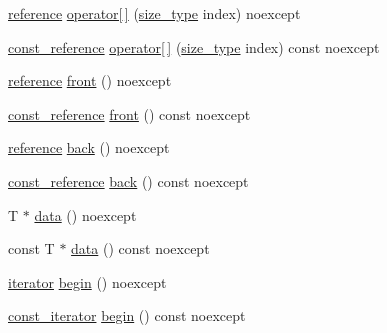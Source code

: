 \begin{DoxyCompactItemize}
\item 
\mbox{\hyperlink{classmage_1_1_dynamic_memory_buffer_a146681be5119c0329409436506334f05}{reference}} \mbox{\hyperlink{classmage_1_1_dynamic_memory_buffer_a0b301053c19560b621f9005cabae4596}{operator\mbox{[}$\,$\mbox{]}}} (\mbox{\hyperlink{classmage_1_1_dynamic_memory_buffer_a45d02825da2b18fd7c24965ed5f46a30}{size\+\_\+type}} index) noexcept
\item 
\mbox{\hyperlink{classmage_1_1_dynamic_memory_buffer_aa454489303e19392c54044d3b3ae67ad}{const\+\_\+reference}} \mbox{\hyperlink{classmage_1_1_dynamic_memory_buffer_abca35ce297de7c1c2e1f007024886c93}{operator\mbox{[}$\,$\mbox{]}}} (\mbox{\hyperlink{classmage_1_1_dynamic_memory_buffer_a45d02825da2b18fd7c24965ed5f46a30}{size\+\_\+type}} index) const noexcept
\item 
\mbox{\hyperlink{classmage_1_1_dynamic_memory_buffer_a146681be5119c0329409436506334f05}{reference}} \mbox{\hyperlink{classmage_1_1_dynamic_memory_buffer_a390f60b27001afa97a7c40aecb22db76}{front}} () noexcept
\item 
\mbox{\hyperlink{classmage_1_1_dynamic_memory_buffer_aa454489303e19392c54044d3b3ae67ad}{const\+\_\+reference}} \mbox{\hyperlink{classmage_1_1_dynamic_memory_buffer_abf584a6f81168b350ea4daa640f85034}{front}} () const noexcept
\item 
\mbox{\hyperlink{classmage_1_1_dynamic_memory_buffer_a146681be5119c0329409436506334f05}{reference}} \mbox{\hyperlink{classmage_1_1_dynamic_memory_buffer_a0b61ef41a8100874b1b468a90ffbf8dc}{back}} () noexcept
\item 
\mbox{\hyperlink{classmage_1_1_dynamic_memory_buffer_aa454489303e19392c54044d3b3ae67ad}{const\+\_\+reference}} \mbox{\hyperlink{classmage_1_1_dynamic_memory_buffer_aba5cd4d73fa6ef09704ff3fcd6e29161}{back}} () const noexcept
\item 
T $\ast$ \mbox{\hyperlink{classmage_1_1_dynamic_memory_buffer_ac6a91f34d530eab77e2c5cd23c5285b3}{data}} () noexcept
\item 
const T $\ast$ \mbox{\hyperlink{classmage_1_1_dynamic_memory_buffer_abbc037be838a7c635b4eb845af16f3f0}{data}} () const noexcept
\item 
\mbox{\hyperlink{classmage_1_1_dynamic_memory_buffer_aa5dca8e81d0c2a9e63d3a9bc61cce904}{iterator}} \mbox{\hyperlink{classmage_1_1_dynamic_memory_buffer_af03830fa33bbd63d09ae138ba5c742c2}{begin}} () noexcept
\item 
\mbox{\hyperlink{classmage_1_1_dynamic_memory_buffer_ad6f32f829dcde2a912f53ed18080ab9c}{const\+\_\+iterator}} \mbox{\hyperlink{classmage_1_1_dynamic_memory_buffer_ab9fab8bb0520cb58935e45244194536a}{begin}} () const noexcept

\end{DoxyCompactItemize}
